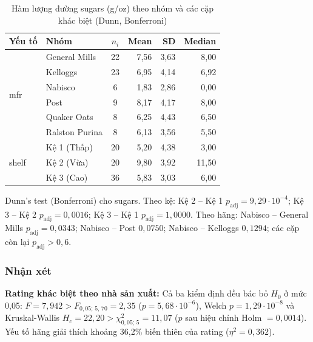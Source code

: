 \documentclass[12pt,a4paper]{article}
\begin{document}
\begin{table}[H]
\centering
\caption{Hàm lượng đường sugars (g/oz) theo nhóm và các cặp khác biệt (Dunn, Bonferroni)}
\label{tab:sugars_nhom}
\begin{tabular}{l l c r r r}
\toprule
Yếu tố & Nhóm & $n_i$ & Mean & SD & Median \\
\midrule
\multirow{6}{*}{mfr}
  & General Mills  & 22 & 7,56 & 3,63 & 8,00 \\
  & Kelloggs       & 23 & 6,95 & 4,14 & 6,92 \\
  & Nabisco        & 6  & 1,83 & 2,86 & 0,00 \\
  & Post           & 9  & 8,17 & 4,17 & 8,00 \\
  & Quaker Oats    & 8  & 6,25 & 4,43 & 6,50 \\
  & Ralston Purina & 8  & 6,13 & 3,56 & 5,50 \\
\midrule
\multirow{3}{*}{shelf}
  & Kệ 1 (Thấp) & 20 & 5,20 & 4,38 & 3,00 \\
  & Kệ 2 (Vừa)  & 20 & 9,80 & 3,92 & 11,50 \\
  & Kệ 3 (Cao)  & 36 & 5,83 & 3,03 & 6,00 \\
\bottomrule
\end{tabular}

\vspace{0.4em}
\begin{minipage}{0.8\textwidth}\small
Dunn's test (Bonferroni) cho sugars. Theo kệ: Kệ 2 -- Kệ 1 $p_{\text{adj}} = 9{,}29\cdot10^{-4}$;
Kệ 3 -- Kệ 2 $p_{\text{adj}} = 0{,}0016$; Kệ 3 -- Kệ 1 $p_{\text{adj}} = 1{,}0000$. Theo hãng:
Nabisco -- General Mills $p_{\text{adj}} = 0{,}0343$; Nabisco -- Post $0{,}0750$;
Nabisco -- Kelloggs $0{,}1294$; các cặp còn lại $p_{\text{adj}} > 0{,}6$.
\end{minipage}
\end{table}

\subsubsection{Nhận xét}

\textbf{Rating khác biệt theo nhà sản xuất:} Cả ba kiểm định đều bác bỏ $H_0$ ở mức
0,05: $F = 7{,}942 > F_{0,05;\,5,\,70} = 2{,}35$ ($p = 5{,}68\cdot10^{-6}$), Welch
$p = 1{,}29\cdot10^{-8}$ và Kruskal-Wallis $H_c = 22{,}20 > \chi^2_{0,05;\,5} = 11{,}07$
($p$ sau hiệu chỉnh Holm $= 0{,}0014$). Yếu tố hãng giải thích khoảng 36,2\% biến thiên của
rating ($\eta^2 = 0{,}362$).
\end{document}
